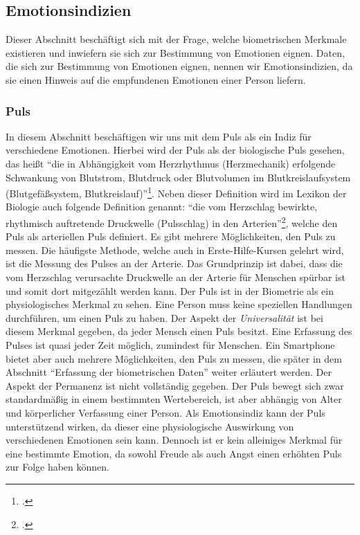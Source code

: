 \subsection{Emotionsindizien}
\label{section:Emotionsindizien}
Dieser Abschnitt beschäftigt sich mit der Frage, welche biometrischen Merkmale existieren und inwiefern sie sich zur Bestimmung von Emotionen eignen. Daten, die sich zur Bestimmung von Emotionen eignen, nennen wir Emotionsindizien, da sie einen Hinweis auf die empfundenen Emotionen einer Person liefern.
\subsubsection{Puls}
In diesem Abschnitt beschäftigen wir uns mit dem Puls als ein Indiz für verschiedene Emotionen. Hierbei wird der Puls als der biologische Puls gesehen, das heißt ``die in Abhängigkeit vom Herzrhythmus (Herzmechanik) erfolgende Schwankung von Blutstrom, Blutdruck oder Blutvolumen im Blutkreislaufsystem (Blutgefäßsystem, Blutkreislauf)''\footcite{Spe18}. Neben dieser Definition wird im Lexikon der Biologie auch folgende Definition genannt: ``die vom Herzschlag bewirkte, rhythmisch auftretende Druckwelle (Pulsschlag) in den Arterien''\footcite{Spe18}, welche den Puls als arteriellen Puls definiert. \newline
Es gibt mehrere Möglichkeiten, den Puls zu messen. Die häufigste Methode, welche auch in Erste-Hilfe-Kursen gelehrt wird, ist die Messung des Pulses an der Arterie. Das Grundprinzip ist dabei, dass die vom Herzschlag verursachte Druckwelle an der Arterie für Menschen spürbar ist und somit dort mitgezählt werden kann.\newline
Der Puls ist in der Biometrie als ein physiologisches Merkmal zu sehen. Eine Person muss keine speziellen Handlungen durchführen, um einen Puls zu haben. Der Aspekt der \textit{Universalität} ist bei diesem Merkmal gegeben, da jeder Mensch einen Puls besitzt. Eine Erfassung des Pulses ist quasi jeder Zeit möglich, zumindest für Menschen. Ein Smartphone bietet aber auch mehrere Möglichkeiten, den Puls zu messen, die später in dem Abschnitt ``Erfassung der biometrischen Daten'' weiter erläutert werden. Der Aspekt der Permanenz ist nicht vollständig gegeben. Der Puls bewegt sich zwar standardmäßig in einem bestimmten Wertebereich, ist aber abhängig von Alter und körperlicher Verfassung einer Person.\newline
Als Emotionsindiz kann der Puls unterstützend wirken, da dieser eine physiologische Auswirkung von verschiedenen Emotionen sein kann. Dennoch ist er kein alleiniges Merkmal für eine bestimmte Emotion, da sowohl Freude als auch Angst einen erhöhten Puls zur Folge haben können.
